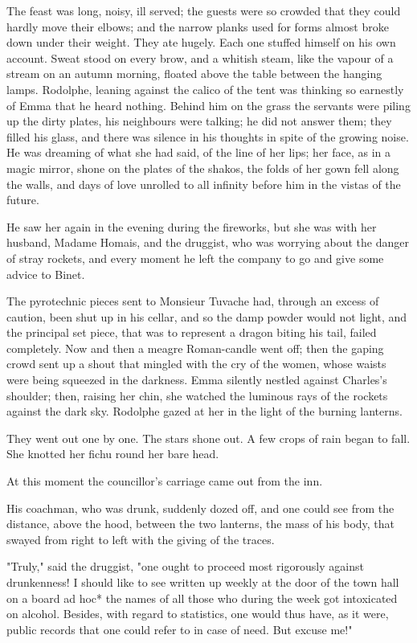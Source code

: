 \documentclass{tufte-book}
\begin{document}
The feast was long, noisy, ill served; the guests were so crowded that
they could hardly move their elbows; and the narrow planks used for
forms almost broke down under their weight. They ate hugely. Each one
stuffed himself on his own account. Sweat stood on every brow, and a
whitish steam, like the vapour of a stream on an autumn morning, floated
above the table between the hanging lamps. Rodolphe, leaning against
the calico of the tent was thinking so earnestly of Emma that he heard
nothing. Behind him on the grass the servants were piling up the dirty
plates, his neighbours were talking; he did not answer them; they filled
his glass, and there was silence in his thoughts in spite of the growing
noise. He was dreaming of what she had said, of the line of her lips;
her face, as in a magic mirror, shone on the plates of the shakos, the
folds of her gown fell along the walls, and days of love unrolled to all
infinity before him in the vistas of the future.

He saw her again in the evening during the fireworks, but she was with
her husband, Madame Homais, and the druggist, who was worrying about the
danger of stray rockets, and every moment he left the company to go and
give some advice to Binet.

The pyrotechnic pieces sent to Monsieur Tuvache had, through an excess
of caution, been shut up in his cellar, and so the damp powder would
not light, and the principal set piece, that was to represent a dragon
biting his tail, failed completely. Now and then a meagre Roman-candle
went off; then the gaping crowd sent up a shout that mingled with the
cry of the women, whose waists were being squeezed in the darkness. Emma
silently nestled against Charles's shoulder; then, raising her chin, she
watched the luminous rays of the rockets against the dark sky. Rodolphe
gazed at her in the light of the burning lanterns.

They went out one by one. The stars shone out. A few crops of rain began
to fall. She knotted her fichu round her bare head.

At this moment the councillor's carriage came out from the inn.

His coachman, who was drunk, suddenly dozed off, and one could see from
the distance, above the hood, between the two lanterns, the mass of his
body, that swayed from right to left with the giving of the traces.

"Truly," said the druggist, "one ought to proceed most rigorously
against drunkenness! I should like to see written up weekly at the door
of the town hall on a board ad hoc* the names of all those who during
the week got intoxicated on alcohol. Besides, with regard to statistics,
one would thus have, as it were, public records that one could refer to
in case of need. But excuse me!"
\end{document}
